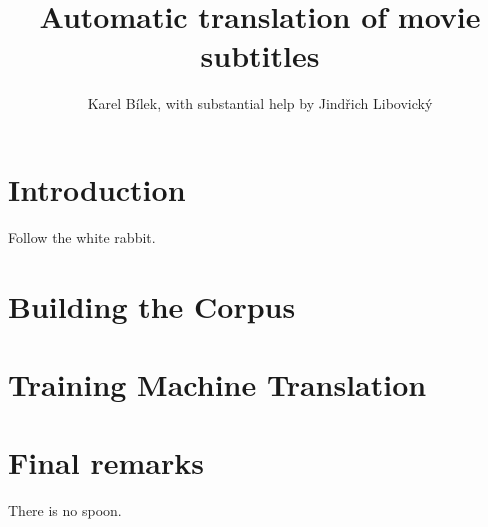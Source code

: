 \documentclass[11pt, oneside]{article}
\title{Automatic translation of movie subtitles}
\author{Karel Bílek, with substantial help by Jindřich Libovický}
\begin{document}
    \maketitle


\section{Introduction}
Follow the white rabbit.

\section{Building the Corpus}


\section{Training Machine Translation}


\section{Final remarks}
There is no spoon.
\end{document}
